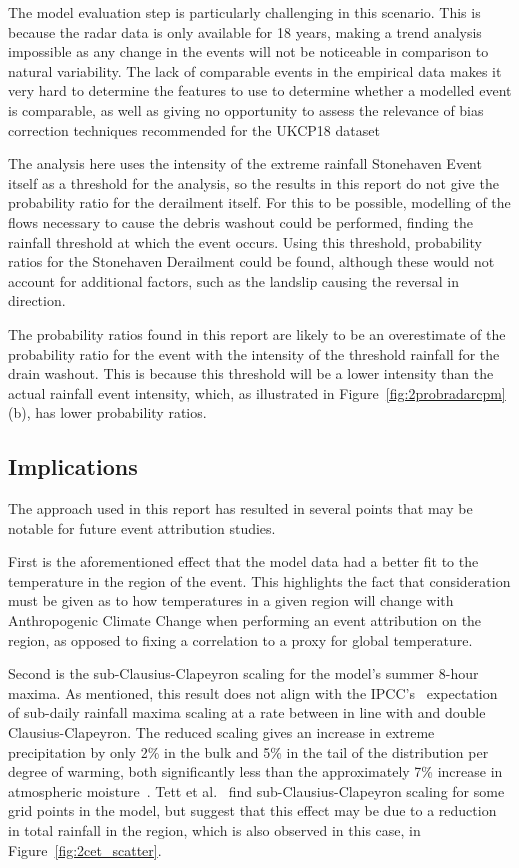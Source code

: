 The model evaluation step is particularly challenging in this scenario.
This is because the radar data is only available for 18 years,
    making a trend analysis impossible as any change in the events will not be noticeable
    in comparison to natural variability.
The lack of comparable events in the empirical data makes it very hard to determine the features to use to determine whether a modelled event is comparable,
    as well as giving no opportunity to assess the relevance of bias correction techniques recommended for the UKCP18 dataset~\cite{model_data}

The analysis here uses the intensity of the extreme rainfall Stonehaven Event itself as a threshold for the analysis,
    so the results in this report do not give the probability ratio for the derailment itself.
For this to be possible,
    modelling of the flows necessary to cause the debris washout could be performed,
    finding the rainfall threshold at which the event occurs.
Using this threshold,
    probability ratios for the Stonehaven Derailment could be found,
    although these would not account for additional factors,
    such as the landslip causing the reversal in direction.

The probability ratios found in this report are likely to be an overestimate of the probability ratio for the event with the intensity of the threshold rainfall for the drain washout.
This is because this threshold will be a lower intensity than the actual rainfall event intensity,
    which, as illustrated in Figure~\ref{fig:2probradarcpm} (b),
    has lower probability ratios.

\subsection{Implications}\label{subsec:disfield}

The approach used in this report has resulted in several points that may be notable for future event attribution studies.

First is the aforementioned effect that the model data had a better fit to the temperature in the region of the event.
This highlights the fact that consideration must be given as to how temperatures in a given region will
    change with Anthropogenic Climate Change when performing an event attribution on the region,
    as opposed to fixing a correlation to a proxy for global temperature.

Second is the sub-Clausius-Clapeyron scaling for the model's summer 8-hour maxima.
As mentioned, this result does not align with the IPCC's~\cite{IPCC_2021}
    expectation of sub-daily rainfall maxima scaling at a rate between in line with and double
    Clausius-Clapeyron.
The reduced scaling gives an increase in extreme precipitation by only 2\% in the bulk
    and 5\% in the tail of the distribution per degree of warming,
    both significantly less than the approximately 7\% increase in atmospheric moisture~\cite{Fowler_2021}.
Tett et al.~\cite{Tett_Soon} find sub-Clausius-Clapeyron scaling for some grid points in the model,
    but suggest that this effect may be due to a reduction in total rainfall in the region,
    which is also observed in this case, in Figure~\ref{fig:2cet_scatter}.

